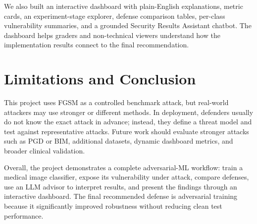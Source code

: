 ﻿\documentclass[10pt]{article}
\begin{document}
We also built an interactive dashboard with plain-English explanations, metric cards, an experiment-stage explorer, defense comparison tables, per-class vulnerability summaries, and a grounded Security Results Assistant chatbot. The dashboard helps graders and non-technical viewers understand how the implementation results connect to the final recommendation.

\section{Limitations and Conclusion}
This project uses FGSM as a controlled benchmark attack, but real-world attackers may use stronger or different methods. In deployment, defenders usually do not know the exact attack in advance; instead, they define a threat model and test against representative attacks. Future work should evaluate stronger attacks such as PGD or BIM, additional datasets, dynamic dashboard metrics, and broader clinical validation.

Overall, the project demonstrates a complete adversarial-ML workflow: train a medical image classifier, expose its vulnerability under attack, compare defenses, use an LLM advisor to interpret results, and present the findings through an interactive dashboard. The final recommended defense is adversarial training because it significantly improved robustness without reducing clean test performance.
\end{document}
